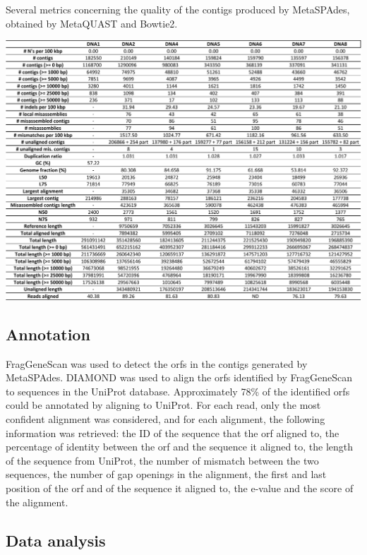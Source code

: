 \documentclass[
  oneside,
  11pt, a4paper,
  footinclude=true,
  headinclude=true,
  cleardoublepage=empty
]{scrbook}
\begin{document}
    \begin{table}[ph!]
    \caption{Several metrics concerning the quality of the contigs produced by MetaSPAdes, obtained by MetaQUAST and Bowtie2.}
    \includegraphics[width=\columnwidth]{FiguresUndTables/Results/Assembling/assembly_results1.pdf}
    \label{fig:assembling_quality1}
    \end{table}

    \subsection{Annotation}
    
    FragGeneScan was used to detect the \gls{orf}s in the contigs generated by MetaSPAdes. DIAMOND was used to align the \gls{orf}s identified by FragGeneScan to sequences in the UniProt database. Approximately 78\% of the identified \gls{orf}s could be annotated by aligning to UniProt. For each read, only the most confident alignment was considered, and for each alignment, the following information was retrieved: the ID of the sequence that the \gls{orf} aligned to, the percentage of identity between the \gls{orf} and the sequence it aligned to, the length of the sequence from UniProt, the number of mismatch between the two sequences, the number of gap openings in the alignment, the first and last position of the \gls{orf} and of the sequence it aligned to, the e-value and the score of the alignment.
    
    \subsection{Data analysis}
    
\end{document}
